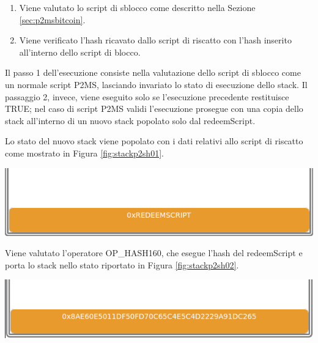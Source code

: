 \begin{enumerate}
  \item Viene valutato lo script di sblocco come descritto nella Sezione \ref{sec:p2msbitcoin}.
  \item Viene verificato l'hash ricavato dallo script di riscatto con l’hash inserito all’interno dello script di blocco.
\end{enumerate}

Il passo 1 dell’esecuzione consiste nella valutazione dello script di sblocco come un normale script P2MS, lasciando invariato lo stato di esecuzione dello stack.
Il passaggio 2, invece, viene eseguito solo se l’esecuzione precedente restituisce TRUE; nel caso di  script P2MS validi l’esecuzione prosegue con una copia dello stack all’interno di un nuovo stack popolato solo dal redeemScript.

Lo stato del nuovo stack viene popolato con i dati relativi allo script di riscatto come mostrato in Figura \ref{fig:stackp2sh01}.

{\centering
\vspace{15pt}
\includegraphics[scale=0.35]{images/script/p2sh/1.png}
\vspace{10pt}
\par}

Viene valutato l’operatore OP\_HASH160, che esegue l’hash del redeemScript e porta lo  stack nello stato riportato in Figura \ref{fig:stackp2sh02}.

{\centering
\vspace{15pt}
\includegraphics[scale=0.35]{images/script/p2sh/2.png}
\vspace{10pt}
\par}

